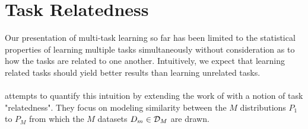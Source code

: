 \section{Task Relatedness}
Our presentation of multi-task learning so far has been limited to the statistical properties of learning multiple tasks simultaneously without consideration as to how the tasks are related to one another. Intuitively, we expect that learning related tasks should yield better results than learning unrelated tasks.
\\\\
\citet{ben2003} attempts to quantify this intuition by extending the work of \citet{baxter2000} with a notion of task "relatedness". They focus on modeling similarity between the $M$ distributions $P_1$ to $P_M$ from which the $M$ datasets $D_m \in \mathcal{D}_M$ are drawn.

